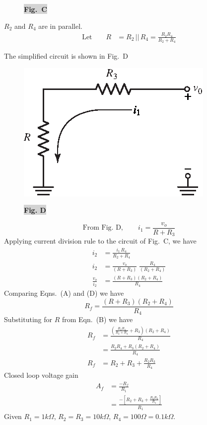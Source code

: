 \begin{solution}
\begin{figure}[H]
\medskip
\colorbox{lightgray}{\bf Fig.~C}
\end{figure}
\noindent
$R_{2}$ and $R_{4}$ are in parallel.
\begin{align*}
\text{Let}\qquad R &= R_{2}\, ||\, R_{4}= \frac{R_{2}R_{4}}{R_{2}+R_{4}}\tag{B}
\end{align*}

The simplified circuit is shown in Fig.~D
\begin{figure}[H]
\centering
\includegraphics{chap4/S3-EE-06-017a.eps}

\smallskip
\colorbox{lightgray}{\bf Fig. D}
\end{figure}
\begin{equation*}
\text{From Fig.~D},\qquad i_{1}=\frac{v_{o}}{R+R_{3}}\tag{C}
\end{equation*}
Applying current division rule to the circuit of Fig.~C, we have
\begin{align*}
i_{2} &= \frac{i_{1}\,R_{4}}{R_{2}+R_{4}}\\[3pt]
i_{2} &= \frac{v_{o}}{(R+R_{3})}\;\frac{R_{4}}{(R_{2}+R_{4})}\\[3pt]
\frac{v_{o}}{i_{2}} &= \frac{(R+R_{3})(R_{2}+R_{4})}{R_{4}}\tag{D}
\end{align*}
Comparing Eqns.~(A) and (D) we have
\begin{equation*}
R_{f}=\frac{(R+R_{3})(R_{2}+R_{4})}{R_{4}}\tag{E}
\end{equation*}
Substituting for $R$ from Eqn.~(B) we have
\begin{align*}
R_{f} &= \frac{\left(\frac{R_{2}R_{4}}{R_{2}+R_{4}}+R_{3}\right)(R_{2}+R_{4})}{R_{4}}\\[6pt]
&= \frac{R_{2}R_{4}+R_{3}(R_{2}+R_{4})}{R_{4}}\\[6pt]
R_{f} &= R_{2}+R_{3}+\frac{R_{2}R_{3}}{R_{4}}\tag{F}
\end{align*}
Closed loop voltage gain
\begin{align*}
A_{f} &= \frac{-R_{f}}{R_{1}}\\[4pt]
&= \frac{-\left[R_{2}+R_{3}+\frac{R_{2}R_{3}}{R_{4}}\right]}{R_{1}}\tag{G}
\end{align*}
Given $R_{1}=1 k\Omega$, $R_{2}=R_{3}=10 k\Omega$, $R_{4}=100\Omega = 0.1 k\Omega$.


\end{solution}

